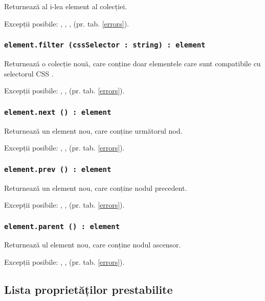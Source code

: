 Returnează al i-lea element al colecției.

Excepții posibile: , , ,  (pr. tab. \ref{errors}).

\subsubsection{\lstinline|element.filter (cssSelector : string) : element|}

Returnează o colecție nouă, care conține doar elementele care sunt compatibile cu selectorul CSS .

Excepții posibile: , ,  (pr. tab. \ref{errors}).
\subsubsection{\lstinline|element.next () : element|}

Returnează un element nou, care conține următorul nod.

Excepții posibile: , ,  (pr. tab. \ref{errors}).

\subsubsection{\lstinline|element.prev () : element|}

Returnează un element nou, care conține nodul precedent.

Excepții posibile: , ,  (pr. tab. \ref{errors}).

\subsubsection{\lstinline|element.parent () : element|}

Returnează ul element nou, care conține nodul ascensor.

Excepții posibile: , ,  (pr. tab. \ref{errors}).

\subsection{Lista proprietăților prestabilite}
\label{elements:predefined:properties}

